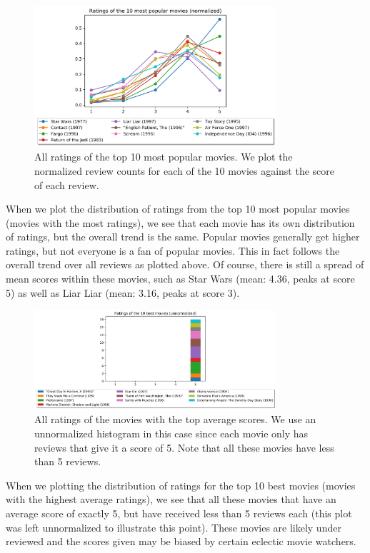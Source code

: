 \begin{figure}[H]
	\centering
	\includegraphics[width=0.8\textwidth]{Fig4-2.png}
	\caption{All ratings of the top 10 most popular movies. We plot the normalized review counts for each of the 10 movies against the score of each review.}
\end{figure}

When we plot the distribution of ratings from the top 10 most popular movies (movies with the most ratings), we see that each movie has its own distribution of ratings, but the overall trend is the same. Popular movies generally get higher ratings, but not everyone is a fan of popular movies. This in fact follows the overall trend over all reviews as plotted above. Of course, there is still a spread of mean scores within these movies, such as Star Wars (mean: 4.36, peaks at score 5) as well as Liar Liar (mean: 3.16, peaks at score 3).

\begin{figure}[H]
	\centering
	\includegraphics[width=0.8\textwidth]{Fig4-3.png}
	\caption{All ratings of the movies with the top average scores. We use an unnormalized histogram in this case since each movie only has reviews that give it a score of 5. Note that all these movies have less than 5 reviews.}
\end{figure}

When we plotting the distribution of ratings for the top 10 best movies (movies with the highest average ratings), we see that all these movies that have an average score of exactly 5, but have received less than 5 reviews each (this plot was left unnormalized to illustrate this point). These movies are likely under reviewed and the scores given may be biased by certain eclectic movie watchers.

